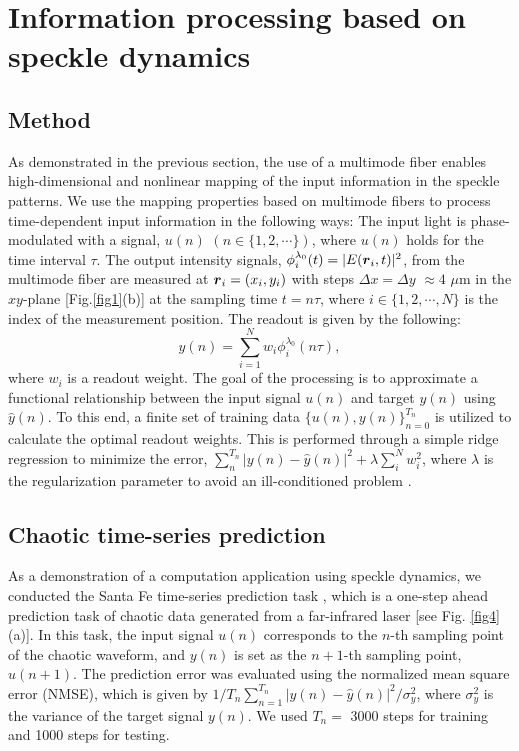 \documentclass{article}
\newcommand{\rr}{\mbox{\boldmath $r$}}
\begin{document}
\section{Information processing based on speckle dynamics}
\subsection{Method \label{sec_method}}
As demonstrated in the previous section, the use of a multimode fiber
enables high-dimensional and nonlinear mapping of the input
information in the speckle patterns.
%
We use the mapping properties based on multimode fibers to process time-dependent
input information in the following ways:
%
The input light is phase-modulated with a signal, $u(n)$
$(n \in \{1,2,\cdots\})$, where $u(n)$ holds for the time interval
$\tau$. 
%
The output intensity signals, $\phi_{i}^{\lambda_0}(t) = |E(\rr_i, t)|^2$, from
the multimode fiber are measured at $\rr_i = (x_i,y_i)$ with steps 
$\Delta x = \Delta y$ $\approx 4$ $\mu$m in the $xy$-plane [Fig.\ref{fig1}(b)] 
at the sampling time $t = n\tau$,
 where $i \in \{1, 2, \cdots, N \}$ is the index of the measurement
position. 
%
The readout is given by the following:
%
\begin{equation}
\hat{y}(n) =\sum_{i=1}^N w_i \phi^{\lambda_0}_i(n\tau), \label{eq_readout1}
\end{equation}
where $w_i$ is a readout weight. 
%
The goal of the processing is to approximate a
functional relationship between the input signal $u(n)$ and target $y(n)$
using $\hat{y}(n)$. 
%
To this end, a finite set of training data 
$\{u(n),y(n) \}_{n=0}^{T_n}$ is utilized to calculate the optimal readout weights. 
%
This is performed through a simple ridge regression to minimize the error,
$\sum_n^{T_n}|y(n)-\hat{y}(n)|^2 + \lambda\sum_i^N w_i^2$, 
where $\lambda$ is the regularization parameter to avoid an
ill-conditioned problem \cite{Larger2017}.

\subsection{Chaotic time-series prediction}
 As a demonstration of a computation application using speckle dynamics, 
we conducted the Santa Fe time-series prediction task \cite{Weigend1993}, 
which is a one-step ahead prediction task of chaotic data generated from 
a far-infrared laser [see Fig. \ref{fig4}(a)]. 
%
In this task, the input signal $u(n)$ corresponds to the $n$-th sampling
point of the chaotic waveform, and $y(n)$ is set as the $n+1$-th sampling point, $u(n+1)$. 
%
 The prediction error was evaluated using the normalized mean square
 error (NMSE), which is given by
 $1/T_n\sum_{n=1}^{T_n}|y(n)-\hat{y}(n)|^2/\sigma_y^2$, where
 $\sigma_y^2$ is the variance of the target signal $y(n)$. 
%
We used $T_n =$ 3000 steps for training and 1000 steps for testing. 
\end{document}
